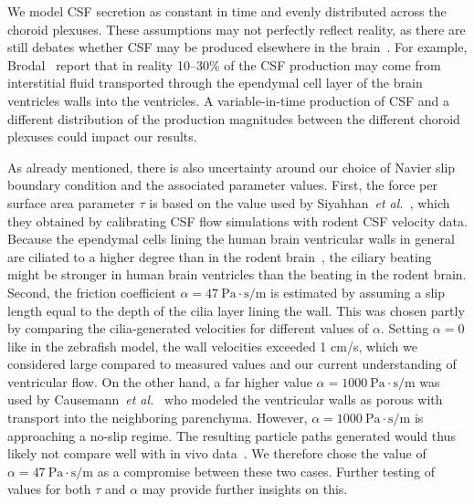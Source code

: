 \documentclass{template}
\begin{document}
We model CSF secretion as constant in time and evenly distributed
across the choroid plexuses. These assumptions may not perfectly reflect
reality, as there are still debates whether CSF may be produced
elsewhere in the brain~\citep{miyajima2015evaluation}.
For example, Brodal~\citep{Brodal2016TheSystem}
report that in reality 10--30\% of the CSF production
may come from interstitial fluid transported through the ependymal cell
layer of the brain ventricles walls into the ventricles.
A variable-in-time production of CSF and a different distribution of the production
magnitudes between the different choroid plexuses could impact our results. 

As already mentioned, there is also uncertainty around our choice
of Navier slip boundary condition and the associated parameter values.
First, the force per surface area parameter $\tau$ is based on the value used by
Siyahhan~\emph{et al.}~\citep{Siyahhan2014FlowVentricles}, which they obtained by
calibrating CSF flow simulations with rodent CSF velocity data. Because the
ependymal cells lining the human brain ventricular walls
in general are ciliated to a higher degree than in the rodent brain~\citep{spassky2017development},
the ciliary beating might be stronger in human brain ventricles
than the beating in the rodent brain. Second,
the friction coefficient $\alpha=47 \ \mathrm{Pa\cdot s/m}$
is estimated by assuming a slip length equal to the depth of the cilia layer lining
the wall. This was chosen partly by comparing the cilia-generated velocities for
different values of $\alpha$. Setting $\alpha=0$ like in the zebrafish model,
the wall velocities exceeded 1 cm/s, which we considered large compared to measured
values and our current understanding of ventricular flow.
On the other hand, a far higher value $\alpha=1000 \ \mathrm{Pa\cdot s/m}$
was used by Causemann~\emph{et al.}~\citep{Causemann2022HumanFramework}
who modeled the ventricular walls as porous with transport into the neighboring
parenchyma. However, $\alpha=1000 \ \mathrm{Pa\cdot s/m}$
is approaching a no-slip regime. The resulting
particle paths generated would thus likely not compare well with
in vivo data~\citep{stadlbauer2010insight}. We therefore
chose the value of $\alpha=47 \ \mathrm{Pa\cdot s/m}$ as a 
compromise between these two cases. Further testing of values for
both $\tau$ and $\alpha$ may provide further insights on this.
\end{document}
